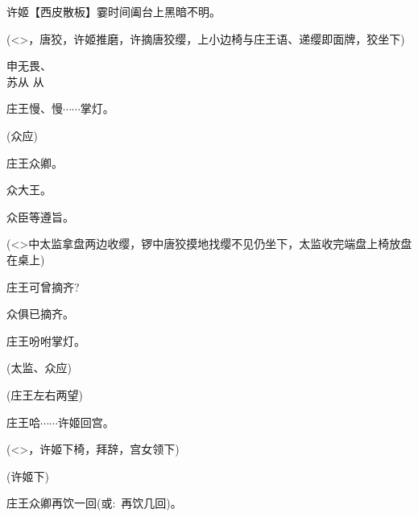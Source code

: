 {许姬\hspace{30pt}【{\akai 西皮散板}】霎时间阖台上黑暗不明。

(\textless{}\!\textgreater{}，唐狡，许姬{\hwfs 推磨}，许{\hwfs 摘}唐狡{\hwfs 缨}，{\hwfs 上小边椅与}庄王{\hwfs 语}、{\hwfs 递缨即面牌}，狡{\hwfs 坐下})

申无畏、\\
苏从 从\hspace{20pt}\raisebox{5pt}{快快点烛。}

庄王\hspace{30pt}慢、慢$\cdots{}\cdots{}$掌灯。

(众{\hwfs 应})

庄王\hspace{30pt}众卿。

众\hspace{40pt}大王。


众\hspace{40pt}臣等遵旨。

(\textless{}\!\textgreater{}{\hwfs 中}太监{\hwfs 拿盘两边收缨}，{\hwfs 锣中}唐狡{\hwfs 摸地找缨不见仍坐下}，太监{\hwfs 收完端盘上椅放盘在桌上})

庄王\hspace{30pt}可曾摘齐?

众\hspace{40pt}俱已摘齐。

庄王\hspace{30pt}吩咐掌灯。

(太监、众{\hwfs}应)

(庄王{\hwfs 左右两望})

庄王\hspace{30pt}哈$\cdots{}\cdots{}$许姬回宫。

(\textless{}\!\textgreater{}，许姬{\hwfs 下椅}，{\hwfs 拜辞}，宫女{\hwfs 领下})


(许姬{\hwfs 下})

庄王\hspace{30pt}众卿再饮一回({\akai 或}:~再饮几回)。

}
